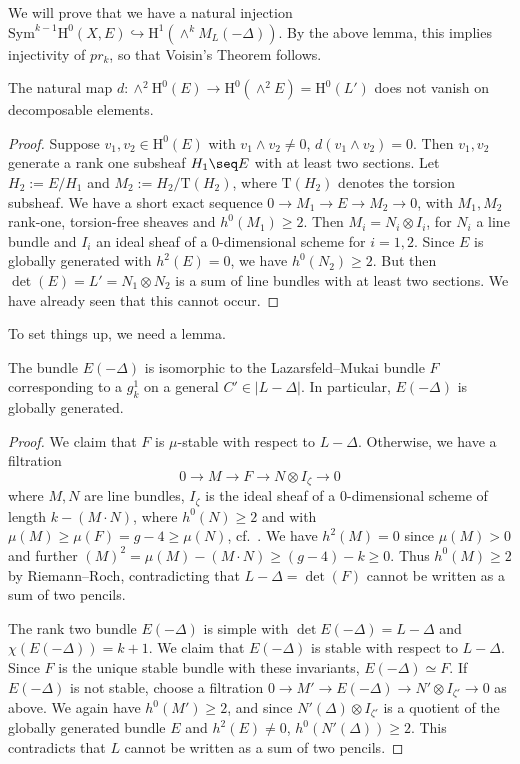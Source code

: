 We will prove that we have a natural injection $\mathrm{Sym}^{k-1}\mathrm{H}^0(X,E) \hookrightarrow \mathrm{H}^1(\wedge^k M_L (-\Delta))$. By the above lemma, this implies injectivity of $pr_k$, so that Voisin's Theorem follows.
\begin{lem}
\notready \label{decomposable}
The natural map $d: \wedge^2 \mathrm{H}^0(E) \to \mathrm{H}^0(\wedge^2 E)=\mathrm{H}^0(L')$ does not vanish on decomposable elements.
\end{lem}
\begin{proof}
Suppose $v_1, v_2 \in \mathrm{H}^0(E)$ with $v_1 \wedge v_2 \neq 0$, $d(v_1 \wedge v_2)=0$. Then $v_1, v_2$ generate a rank one subsheaf $H_1 \seq E$ with at least two sections. Let $H_2:=E/H_1$ and $M_2:=H_2/\mathrm{T}(H_2)$, where $\mathrm{T}(H_2)$ denotes the torsion subsheaf. We have a short exact sequence $0 \to M_1 \to E \to M_2 \to 0$, with $M_1,M_2$ rank-one, torsion-free sheaves and $h^0(M_1) \geq 2$. Then $M_i=N_i \otimes I_i$, for $N_i$ a line bundle and $I_i$ an ideal sheaf of a $0$-dimensional scheme for $i=1,2$. Since $E$ is globally generated with $h^2(E)=0$, we have $h^0(N_2) \geq 2$. But then $\det(E)=L'=N_1 \otimes N_2$ is a sum of line bundles with at least two sections. We have already seen that this cannot occur.
\end{proof}
To set things up, we need a lemma.
\begin{lem}
\notready
The bundle $E(-\Delta)$ is isomorphic to the Lazarsfeld--Mukai bundle $F$ corresponding to a $g^1_{k}$ on a general $C' \in |L-\Delta|$. In particular, $E(-\Delta)$ is globally generated.
\end{lem}
\begin{proof}
We claim that $F$ is $\mu$-stable with respect to $L-\Delta$. Otherwise, we have a filtration
$$0 \to M \to F \to N \otimes I_{\zeta} \to 0$$
where $M, N$ are line bundles, $I_{\zeta}$ is the ideal sheaf of a $0$-dimensional scheme of length $k-(M \cdot N)$, where $h^0(N) \geq 2$ and with $\mu(M) \geq \mu(F)=g-4 \geq \mu(N)$, cf.\ \cite{lelli-chiesa}. We have $h^2(M)=0$ since $\mu(M)>0$ and further $(M)^2=\mu(M)-(M\cdot N)\geq (g-4)-k \geq 0$. Thus $h^0(M) \geq 2$ by Riemann--Roch, contradicting that $L-\Delta=\det(F)$ cannot be written as a sum of two pencils.


The rank two bundle $E(-\Delta)$ is simple with $\det E(-\Delta)=L-\Delta$ and $\chi(E(-\Delta))=k+1$. We claim that $E(-\Delta)$ is stable with respect to $L-\Delta$. Since $F$ is the unique stable bundle with these invariants, $E(-\Delta) \simeq F$. If $E(-\Delta)$ is not stable, choose a filtration $0 \to M' \to E(-\Delta) \to N' \otimes I_{\zeta'} \to 0$
as above. We again have $h^0(M') \geq 2$, and since $N'(\Delta) \otimes I_{\zeta'}$ is a quotient of the globally generated bundle $E$ and $h^2(E)\neq 0$, $h^0(N'(\Delta)) \geq 2$. This contradicts that $L$ cannot be written as a sum of two pencils.
\end{proof}



